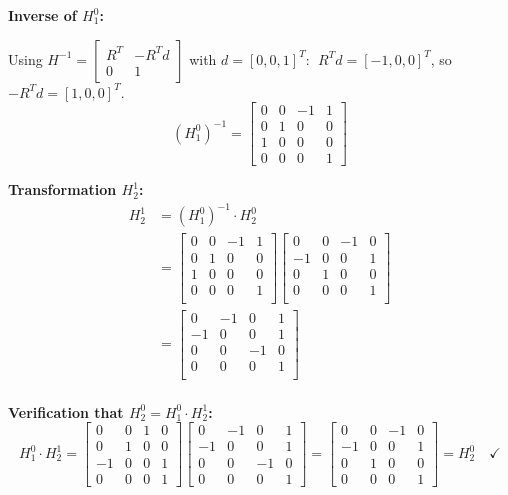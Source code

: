 \documentclass[12pt]{article}
\begin{document}
\textbf{Inverse of $H_1^0$:}

Using $H^{-1} = \begin{bmatrix} R^T & -R^T d \\ 0 & 1 \end{bmatrix}$ with
$d = [0,0,1]^T$: $\;R^T d = [-1,0,0]^T$, so $-R^T d = [1,0,0]^T$.
\[
(H_1^0)^{-1} =
\begin{bmatrix}
 0 & 0 & -1 &  1 \\
 0 & 1 &  0 &  0 \\
 1 & 0 &  0 &  0 \\
 0 & 0 &  0 &  1
\end{bmatrix}
\]

\textbf{Transformation $H_2^1$:}
\begin{align*}
    H_2^1 &= (H_1^0)^{-1} \cdot H_2^0\\
    &=
    \begin{bmatrix}
        0 & 0 & -1 &  1\\
        0 & 1 &  0 &  0\\
        1 & 0 &  0 &  0\\
        0 & 0 &  0 &  1\\
    \end{bmatrix}
    \begin{bmatrix}
         0 & 0 & -1 & 0\\
        -1 & 0 &  0 & 1\\
         0 & 1 &  0 & 0\\
         0 & 0 &  0 & 1\\
    \end{bmatrix}\\
    &=
    \begin{bmatrix}
         0 & -1 &  0 &  1\\
        -1 &  0 &  0 &  1\\
         0 &  0 & -1 &  0\\
         0 &  0 &  0 &  1\\
    \end{bmatrix}\\
\end{align*}

\textbf{Verification that $H_2^0 = H_1^0 \cdot H_2^1$:}
\[
H_1^0 \cdot H_2^1 =
\begin{bmatrix}
 0 & 0 & 1 & 0\\
 0 & 1 & 0 & 0\\
-1 & 0 & 0 & 1\\
 0 & 0 & 0 & 1
\end{bmatrix}
\begin{bmatrix}
 0 & -1 &  0 & 1\\
-1 &  0 &  0 & 1\\
 0 &  0 & -1 & 0\\
 0 &  0 &  0 & 1
\end{bmatrix}
=
\begin{bmatrix}
 0 &  0 & -1 & 0\\
-1 &  0 &  0 & 1\\
 0 &  1 &  0 & 0\\
 0 &  0 &  0 & 1
\end{bmatrix}
= H_2^0 \quad \checkmark
\]
\end{document}

